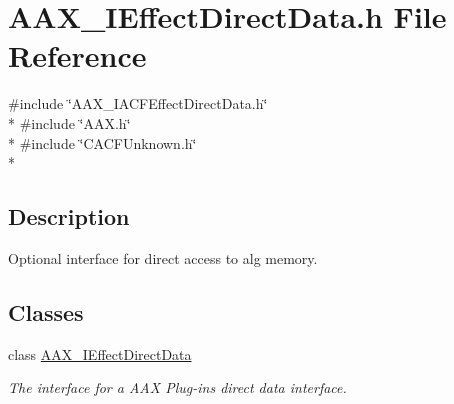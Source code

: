 \hypertarget{a00245}{}\section{A\+A\+X\+\_\+\+I\+Effect\+Direct\+Data.\+h File Reference}
\label{a00245}
{\ttfamily \#include \char`\"{}A\+A\+X\+\_\+\+I\+A\+C\+F\+Effect\+Direct\+Data.\+h\char`\"{}}\\*
{\ttfamily \#include \char`\"{}A\+A\+X.\+h\char`\"{}}\\*
{\ttfamily \#include \char`\"{}C\+A\+C\+F\+Unknown.\+h\char`\"{}}\\*


\subsection{Description}
Optional interface for direct access to alg memory. 

\subsection*{Classes}
\begin{DoxyCompactItemize}
\item 
class \hyperlink{a00097}{A\+A\+X\+\_\+\+I\+Effect\+Direct\+Data}
\begin{DoxyCompactList}\small\item\em The interface for a A\+A\+X Plug-\/in\textquotesingle{}s direct data interface. \end{DoxyCompactList}\end{DoxyCompactItemize}
